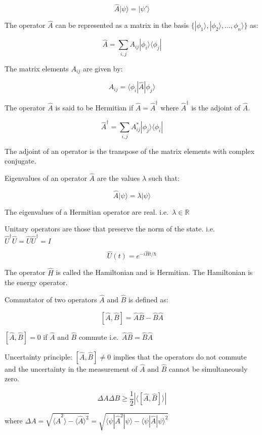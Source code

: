 \documentclass[
  letterpaper,
  DIV=11,
  numbers=noendperiod]{scrreprt}
\begin{document}
\[\hat{A}|\psi\rangle = |\psi'\rangle\]

The operator \(\hat{A}\) can be represented as a matrix in the basis
\(\{|\phi_1\rangle, |\phi_2\rangle, ..., \phi_n\rangle\}\) as:

\[\hat{A} = \sum_{i,j} A_{ij} |\phi_i\rangle \langle \phi_j |\]

The matrix elements \(A_{ij}\) are given by:

\[A_{ij} = \langle \phi_i | \hat{A} | \phi_j \rangle\]

The operator \(\hat{A}\) is said to be Hermitian if
\(\hat{A} = \hat{A}^\dagger\) where \(\hat{A}^\dagger\) is the adjoint
of \(\hat{A}\).

\[\hat{A}^\dagger = \sum_{i,j} A_{ij}^* |\phi_j\rangle \langle \phi_i |\]

The adjoint of an operator is the transpose of the matrix elements with
complex conjugate.

Eigenvalues of an operator \(\hat{A}\) are the values \(\lambda\) such
that:

\[\hat{A}|\psi\rangle = \lambda|\psi\rangle\]

The eigenvalues of a Hermitian operator are real.
i.e.~\(\lambda \in \mathbb{R}\)

Unitary operators are those that preserve the norm of the state.
i.e.~\(\hat{U}^\dagger \hat{U} = \hat{U} \hat{U}^\dagger = I\)

\[\hat{U}(t) = e^{-i\hat{H}t/\hbar}\]

The operator \(\hat{H}\) is called the Hamiltonian and is Hermitian. The
Hamiltonian is the energy operator.

Commutator of two operators \(\hat{A}\) and \(\hat{B}\) is defined as:

\[[\hat{A}, \hat{B}] = \hat{A}\hat{B} - \hat{B}\hat{A}\]

\([\hat{A}, \hat{B}] = 0\) if \(\hat{A}\) and \(\hat{B}\) commute
i.e.~\(\hat{A}\hat{B} = \hat{B}\hat{A}\)

Uncertainty principle: \([\hat{A}, \hat{B}] \neq 0\) implies that the
operators do not commute and the uncertainty in the measurement of
\(\hat{A}\) and \(\hat{B}\) cannot be simultaneously zero.

\[\Delta A \Delta B \geq \frac{1}{2} |\langle [\hat{A}, \hat{B}] \rangle|\]

where
\(\Delta A = \sqrt{\langle \hat{A}^2 \rangle - \langle \hat{A} \rangle^2} = \sqrt{\langle \psi | \hat{A}^2 | \psi \rangle - \langle \psi | \hat{A} | \psi \rangle^2}\)
\end{document}
